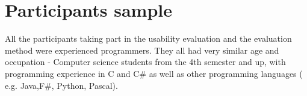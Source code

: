\section{Participants sample}

All the participants taking part in the usability evaluation and the evaluation method were experienced programmers. They all had very similar age and occupation - Computer science students from the 4th semester and up, with programming experience in C and C\# as well as other programming languages ( e.g. Java,F\#, Python, Pascal). 

